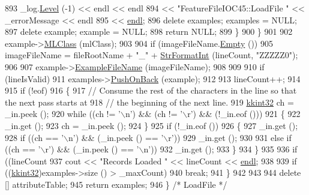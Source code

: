 \begin{DoxyCode}
893         \_log.\hyperlink{class_k_k_b_1_1_run_log_a32cf761d7f2e747465fd80533fdbb659}{Level} (-1) << endl << endl
894                         << \textcolor{stringliteral}{"FeatureFileIOC45::LoadFile  "} << \_errorMessage << endl
895                         << \hyperlink{namespace_k_k_b_ad1f50f65af6adc8fa9e6f62d007818a8}{endl};
896         \textcolor{keyword}{delete}  examples;  examples = NULL;
897         \textcolor{keyword}{delete}  example;   example  = NULL;
898         \textcolor{keywordflow}{return}  NULL;
899       \}
900     \}
901 
902     example->\hyperlink{class_k_k_m_l_l_1_1_feature_vector_a3c8fe002c6e868f8c00059c004fb32fd}{MLClass} (mlClass);
903 
904     \textcolor{keywordflow}{if}  (imageFileName.\hyperlink{class_k_k_b_1_1_k_k_str_ac69942f73fffd672ec2a6e1c410afdb6}{Empty} ())
905       imageFileName = fileRootName + \textcolor{stringliteral}{"\_"} + \hyperlink{namespace_k_k_b_ae3bde258fa036604fac8bdb0277ab46e}{StrFormatInt} (lineCount, \textcolor{stringliteral}{"ZZZZZ0"});
906 
907     example->\hyperlink{class_k_k_m_l_l_1_1_feature_vector_ab47c89ab1e9396664fdc0dc34b6e1ab5}{ExampleFileName} (imageFileName);
908 
909 
910     \textcolor{keywordflow}{if}  (lineIsValid)
911       examples->\hyperlink{class_k_k_m_l_l_1_1_feature_vector_list_abd43779a90a6aa3db1de8092be877bdb}{PushOnBack} (example);
912 
913     lineCount++;
914 
915     \textcolor{keywordflow}{if}  (!eof)
916     \{
917       \textcolor{comment}{// Consume the rest of the characters in the line so that the next pass starts at}
918       \textcolor{comment}{// the beginning of the next line.}
919       \hyperlink{namespace_k_k_b_a8fa4952cc84fda1de4bec1fbdd8d5b1b}{kkint32}  ch = \_in.peek ();
920       \textcolor{keywordflow}{while}  ((ch != \textcolor{charliteral}{'\(\backslash\)n'})  &&  (ch != \textcolor{charliteral}{'\(\backslash\)r'})  &&  (!\_in.eof ()))
921       \{
922         \_in.get ();
923         ch = \_in.peek ();
924       \}
925       \textcolor{keywordflow}{if}  (!\_in.eof ())
926       \{
927         \_in.get ();
928         \textcolor{keywordflow}{if}  ((ch == \textcolor{charliteral}{'\(\backslash\)n'})  &&  (\_in.peek () == \textcolor{charliteral}{'\(\backslash\)r'}))
929            \_in.get ();
930 
931         \textcolor{keywordflow}{else} \textcolor{keywordflow}{if}  ((ch == \textcolor{charliteral}{'\(\backslash\)r'})  &&  (\_in.peek () == \textcolor{charliteral}{'\(\backslash\)n'}))
932            \_in.get ();
933       \}
934     \}
935 
936     \textcolor{keywordflow}{if}  ((lineCount %
937       cout  << \textcolor{stringliteral}{"Records Loaded "} << lineCount << \hyperlink{namespace_k_k_b_ad1f50f65af6adc8fa9e6f62d007818a8}{endl};
938 
939     \textcolor{keywordflow}{if}  ((\hyperlink{namespace_k_k_b_a8fa4952cc84fda1de4bec1fbdd8d5b1b}{kkint32})examples->size () > \_maxCount)
940       \textcolor{keywordflow}{break};
941   \}
942 
943 
944   \textcolor{keyword}{delete}  [] attributeTable;
945   \textcolor{keywordflow}{return}  examples;
946 \}  \textcolor{comment}{/* LoadFile */}
\end{DoxyCode}
